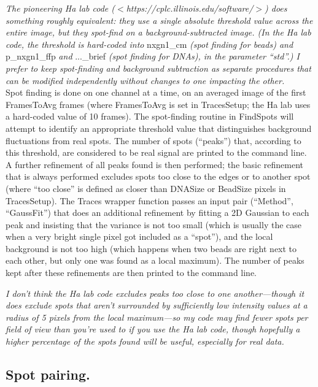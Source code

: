 \documentclass[11pt]{article}
\begin{document}
{\it The pioneering Ha lab code ($<$https://cplc.illinois.edu/software/$>$) does something roughly equivalent: they use a single absolute threshold value across the entire image, but they spot-find on a background-subtracted image. (In the Ha lab code, the threshold is hard-coded into} nxgn1\_cm {\it (spot finding for beads) and} p\_nxgn1\_ffp {\it and} ...\_brief {\it (spot finding for DNAs), in the parameter ``std''.) I prefer to keep spot-finding and background subtraction as separate procedures that can be modified independently without changes to one impacting the other.}\\

\noindent Spot finding is done on one channel at a time, on an averaged image of the first FramesToAvg frames (where FramesToAvg is set in TracesSetup; the Ha lab uses a hard-coded value of 10 frames). The spot-finding routine in FindSpots will attempt to identify an appropriate threshold value that distinguishes background fluctuations from real spots. The number of spots (``peaks'') that, according to this threshold, are considered to be real signal are printed to the command line. A further refinement of all peaks found is then performed; the basic refinement that is always performed excludes spots too close to the edges or to another spot (where ``too close'' is defined as closer than DNASize or BeadSize pixels in TracesSetup). The Traces wrapper function passes an input pair (``Method'', ``GaussFit'') that does an additional refinement by fitting a 2D Gaussian to each peak and insisting that the variance is not too small (which is usually the case when a very bright single pixel got included as a ``spot''), and the local background is not too high (which happens when two beads are right next to each other, but only one was found as a local maximum). The number of peaks kept after these refinements are then printed to the command line.

{\it I don't think the Ha lab code excludes peaks too close to one another---though it does exclude spots that aren't surrounded by sufficiently low intensity values at a radius of 5 pixels from the local maximum---so my code may find fewer spots per field of view than you're used to if you use the Ha lab code, though hopefully a higher percentage of the spots found will be useful, especially for real data.}

\subsection{Spot pairing.}
\end{document}
